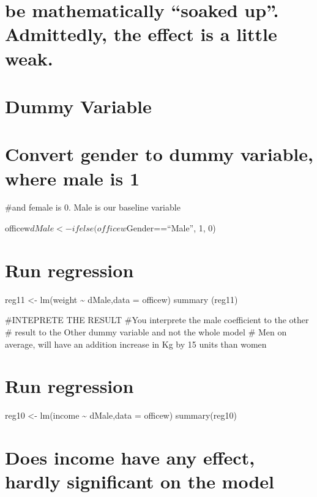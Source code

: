 \documentclass[
]{article}
\begin{document}
\hypertarget{be-mathematically-soaked-up.-admittedly-the-effect-is-a-little-weak.}{%
\section{be mathematically ``soaked up''. Admittedly, the effect is a
little
weak.}\label{be-mathematically-soaked-up.-admittedly-the-effect-is-a-little-weak.}}

\hypertarget{dummy-variable}{%
\section{Dummy Variable}\label{dummy-variable}}

\hypertarget{convert-gender-to-dummy-variable-where-male-is-1}{%
\section{Convert gender to dummy variable, where male is
1}\label{convert-gender-to-dummy-variable-where-male-is-1}}

\#and female is 0. Male is our baseline variable

officew\(dMale<- ifelse(officew\)Gender==``Male'', 1, 0)

\hypertarget{run-regression}{%
\section{Run regression}\label{run-regression}}

reg11 \textless- lm(weight \textasciitilde{} dMale,data = officew)
summary (reg11)

\#INTEPRETE THE RESULT \#You interprete the male coefficient to the
other \# result to the Other dummy variable and not the whole model \#
Men on average, will have an addition increase in Kg by 15 units than
women

\hypertarget{run-regression-1}{%
\section{Run regression}\label{run-regression-1}}

reg10 \textless- lm(income \textasciitilde{} dMale,data = officew)
summary(reg10)

\hypertarget{does-income-have-any-effect-hardly-significant-on-the-model}{%
\section{Does income have any effect, hardly significant on the
model}\label{does-income-have-any-effect-hardly-significant-on-the-model}}
\end{document}
